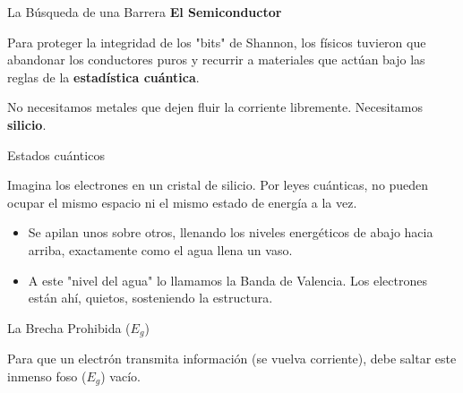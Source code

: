 \documentclass[10pt, aspectratio=169]{beamer}
\begin{document}
\begin{frame}{La Búsqueda de una Barrera}
    \vspace{0.4cm}
    \Large \textbf{El Semiconductor}
    
    \vspace{0.6cm}
    \normalsize
    Para proteger la integridad de los "bits" de Shannon, los físicos tuvieron que abandonar los conductores puros y recurrir a materiales que actúan bajo las reglas de la \textbf{estadística cuántica}.
    
    \vspace{0.4cm}
    No necesitamos metales que dejen fluir la corriente libremente. Necesitamos \alert{\textbf{silicio}}.
\end{frame}

\begin{frame}{Estados cuánticos}
    \vspace{0.4cm}
    
    \vspace{0.4cm}
    \normalsize
    Imagina los electrones en un cristal de silicio. Por leyes cuánticas, no pueden ocupar el mismo espacio ni el mismo estado de energía a la vez.
    
    \vspace{0.4cm}
    \begin{itemize}
        \setlength\itemsep{0.3cm}
        \item Se apilan unos sobre otros, llenando los niveles energéticos de abajo hacia arriba, exactamente como el agua llena un vaso.
        \item A este "nivel del agua" lo llamamos la Banda de Valencia. Los electrones están ahí, quietos, sosteniendo la estructura.
    \end{itemize}
\end{frame}

\begin{frame}{La Brecha Prohibida ($E_g$)}
    \begin{center}
        
        
        \vspace{0.4cm}
        Para que un electrón transmita información (se vuelva corriente), debe saltar este inmenso foso ($E_g$) vacío.
    \end{center}
\end{frame}
\end{document}
